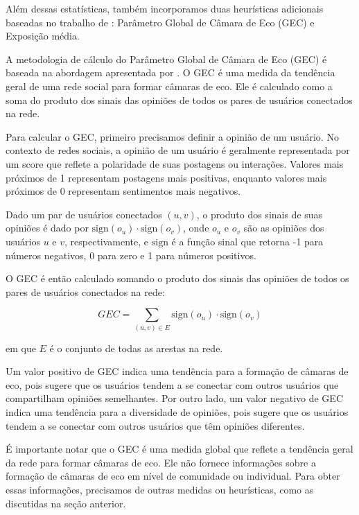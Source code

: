 Além dessas estatísticas, também incorporamos duas heurísticas adicionais baseadas no trabalho de : Parâmetro Global de Câmara de Eco (GEC) e Exposição média.

A metodologia de cálculo do Parâmetro Global de Câmara de Eco (GEC) é baseada na abordagem apresentada por . O GEC é uma medida da tendência geral de uma rede social para formar câmaras de eco. Ele é calculado como a soma do produto dos sinais das opiniões de todos os pares de usuários conectados na rede.

Para calcular o GEC, primeiro precisamos definir a opinião de um usuário. No contexto de redes sociais, a opinião de um usuário é geralmente representada por um score que reflete a polaridade de suas postagens ou interações. Valores mais próximos de 1 representam postagens mais positivas, enquanto valores mais próximos de 0 representam sentimentos mais negativos.

Dado um par de usuários conectados $(u, v)$, o produto dos sinais de suas opiniões é dado por $\text{sign}(o_u) \cdot \text{sign}(o_v)$, onde $o_u$ e $o_v$ são as opiniões dos usuários $u$ e $v$, respectivamente, e $\text{sign}$ é a função sinal que retorna -1 para números negativos, 0 para zero e 1 para números positivos.

O GEC é então calculado somando o produto dos sinais das opiniões de todos os pares de usuários conectados na rede:

\begin{equation}
	GEC = \sum_{(u, v) \in E} \text{sign}(o_u) \cdot \text{sign}(o_v)
\end{equation}

em que $E$ é o conjunto de todas as arestas na rede.

Um valor positivo de GEC indica uma tendência para a formação de câmaras de eco, pois sugere que os usuários tendem a se conectar com outros usuários que compartilham opiniões semelhantes. Por outro lado, um valor negativo de GEC indica uma tendência para a diversidade de opiniões, pois sugere que os usuários tendem a se conectar com outros usuários que têm opiniões diferentes.

É importante notar que o GEC é uma medida global que reflete a tendência geral da rede para formar câmaras de eco. Ele não fornece informações sobre a formação de câmaras de eco em nível de comunidade ou individual. Para obter essas informações, precisamos de outras medidas ou heurísticas, como as discutidas na seção anterior.


